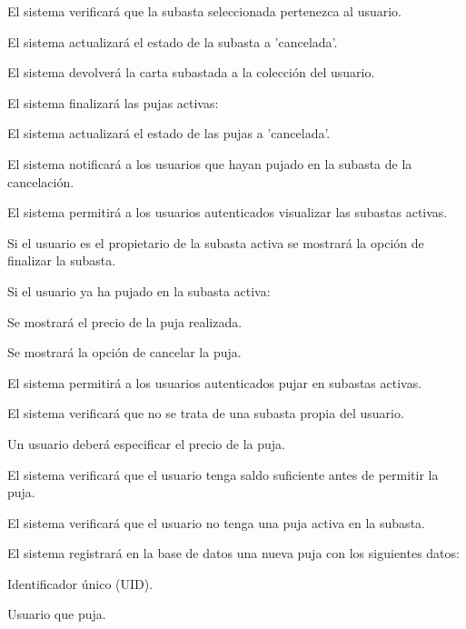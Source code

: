\begin{RFSubastas}
\begin{RFSubastas}
		\item El sistema verificará que la subasta seleccionada pertenezca al usuario.
		\item El sistema actualizará el estado de la subasta a 'cancelada'.
		\item El sistema devolverá la carta subastada a la colección del usuario.
		\item El sistema finalizará las pujas activas:
		\begin{RFSubastas}
			\item El sistema actualizará el estado de las pujas a 'cancelada'.
			\item El sistema notificará a los usuarios que hayan pujado en la subasta de la cancelación.
		\end{RFSubastas}
	\end{RFSubastas}
	\item El sistema permitirá a los usuarios autenticados visualizar las subastas activas.
	\begin{RFSubastas}
		\item Si el usuario es el propietario de la subasta activa se mostrará la opción de finalizar la subasta.
		\item Si el usuario ya ha pujado en la subasta activa:
		\begin{RFSubastas}
			\item Se mostrará el precio de la puja realizada.
			\item Se mostrará la opción de cancelar la puja.
		\end{RFSubastas}
	\end{RFSubastas}
	\item El sistema permitirá a los usuarios autenticados pujar en subastas activas.
	\begin{RFSubastas}
		\item El sistema verificará que no se trata de una subasta propia del usuario.
		\item Un usuario deberá especificar el precio de la puja.
		\item El sistema verificará que el usuario tenga saldo suficiente antes de permitir la puja.
		\item El sistema verificará que el usuario no tenga una puja activa en la subasta.
		\item El sistema registrará en la base de datos una nueva puja con los siguientes datos:
		\begin{RFSubastas}
			\item Identificador único (UID).
			\item Usuario que puja.

\end{RFSubastas}
\end{RFSubastas}
\end{RFSubastas}
